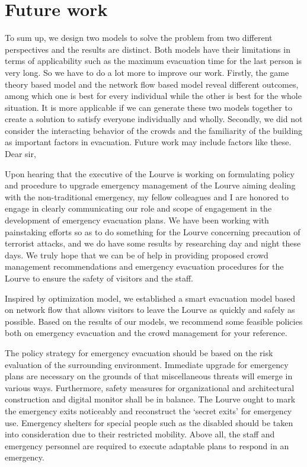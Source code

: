\documentclass{mcmthesis}
\begin{document}
	\section{Future work}
	
	To sum up, we design two models to solve the problem from two different perspectives and the results are distinct. Both models have their limitations in terms of applicability such as the maximum evacuation time for the last person is very long. So we have to do a lot more to improve our work.
	Firstly, the game theory based model and the network flow based model reveal different outcomes, among which one is best for every individual while the other is best for the whole situation. It is more applicable if we can generate these two models together to create a solution to satisfy everyone individually and wholly.
	Secondly, we did not consider the interacting behavior of the crowds and the familiarity of the building as important factors in evacuation. Future work may include  factors like these.
	\newpage
	Dear sir,
	
	Upon hearing that the executive of the Lourve is working on formulating policy and procedure to upgrade emergency management of the Lourve aiming dealing with the non-traditional emergency, my fellow colleagues and I are honored to engage in clearly communicating our role and scope of engagement in the development of emergency evacuation plans. We have been working with painstaking efforts so as to do something for the Lourve concerning precaution of terrorist attacks, and we do have some results by researching day and night these days. We truly hope that we can be of help in providing proposed crowd management recommendations and emergency evacuation procedures for the Lourve to ensure the safety of visitors and the staff.
	
	Inspired by optimization model, we established a smart evacuation model based on network flow that allows visitors to leave the Lourve as quickly and safely as possible. Based on the results of our models, we recommend some feasible policies both on emergency evacuation and the crowd management for your reference.
	
	The policy strategy for emergency evacuation should be based on the risk evaluation of the surrounding environment. Immediate upgrade for emergency plans are necessary on the grounds of that miscellaneous threats will emerge in various ways. Furthermore, safety measures for organizational and architectural construction and digital monitor shall be in balance. The Lourve ought to mark the emergency exits noticeably and reconstruct the ‘secret exits’ for emergency use. Emergency shelters for special people such as the disabled should be taken into consideration due to their restricted mobility. Above all, the staff and emergency personnel are required to execute adaptable plans to respond in an emergency.
	
\end{document}

